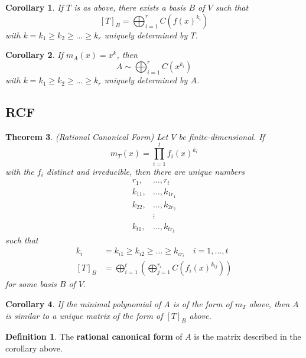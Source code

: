 \documentclass[12pt]{article}
\newtheorem{thm}{Theorem}[section]
\newtheorem{cor}[thm]{Corollary}
\theoremstyle{definition}
\newtheorem*{defn*}{Definition}
\begin{document}
\begin{cor}
	If $T$ is as above, there exists a basis $B$ of $V$ such that
	$$[T]_B = \bigoplus_{i = 1}^rC(f(x)^{k_i})$$
	with $k = k_1 \geq k_2 \geq \ldots \geq k_r$ uniquely determined by $T$.
\end{cor}

\begin{cor}
	If $m_A(x) = x^k$, then
	$$A \sim \bigoplus_{i = 1}^rC(x^{k_i})$$
	with $k = k_1 \geq k_2 \geq \ldots \geq k_r$ uniquely determined by $A$.
\end{cor}

\subsection{RCF}

\begin{thm}
	(Rational Canonical Form)
	Let $V$ be finite-dimensional.
	If
	$$m_T(x) = \prod_{i = 1}^tf_i(x)^{k_i}$$
	with the $f_i$ distinct and irreducible, then there are unique numbers
	\begin{align*}
		   r_1, &\ldots, r_t\\
		k_{11}, &\ldots, k_{1r_1}\\
		k_{22}, &\ldots, k_{2r_2}\\
				&\vdots\\
		k_{t1}, &\ldots, k_{tr_t}
	\end{align*}
	such that
	\begin{align*}
		k_i &= k_{i1} \geq k_{i2} \geq \ldots \geq k_{ir_i}\quad i = 1, \ldots, t\\
		[T]_B &= \bigoplus_{i = 1}^t\left(\bigoplus_{j = 1}^{r_i}C\left(f_i(x)^{k_{ij}}\right)\right)
	\end{align*}
	for some basis $B$ of $V$.
\end{thm}

\begin{cor}
	If the minimal polynomial of $A$ is of the form of $m_T$ above, then $A$ is similar to a unique matrix of the form of $[T]_B$ above.
\end{cor}

\begin{defn*}
	The \textbf{rational canonical form} of $A$ is the matrix described in the corollary above.
\end{defn*}
\end{document}
